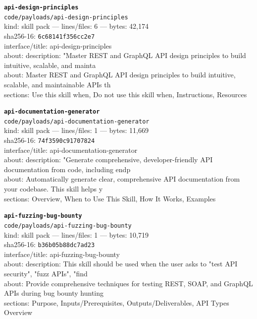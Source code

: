 \noindent\textbf{\texttt{api-design-principles}}\\
\texttt{code/payloads/api-design-principles}\\
kind: skill pack --- lines/files: 6 --- bytes: 42,174\\
sha256-16: \texttt{6c68141f356cc2e7}\\
interface/title: api-design-principles\\
about: description: "Master REST and GraphQL API design principles to build intuitive, scalable, and mainta\\
about: Master REST and GraphQL API design principles to build intuitive, scalable, and maintainable APIs th\\
sections: Use this skill when, Do not use this skill when, Instructions, Resources\\
\vspace*{6.0pt}

\noindent\textbf{\texttt{api-documentation-generator}}\\
\texttt{code/payloads/api-documentation-generator}\\
kind: skill pack --- lines/files: 1 --- bytes: 11,669\\
sha256-16: \texttt{74f3590c91707824}\\
interface/title: api-documentation-generator\\
about: description: "Generate comprehensive, developer-friendly API documentation from code, including endp\\
about: Automatically generate clear, comprehensive API documentation from your codebase. This skill helps y\\
sections: Overview, When to Use This Skill, How It Works, Examples\\
\vspace*{6.0pt}

\noindent\textbf{\texttt{api-fuzzing-bug-bounty}}\\
\texttt{code/payloads/api-fuzzing-bug-bounty}\\
kind: skill pack --- lines/files: 1 --- bytes: 10,719\\
sha256-16: \texttt{b36b05b88dc7ad23}\\
interface/title: api-fuzzing-bug-bounty\\
about: description: This skill should be used when the user asks to "test API security", "fuzz APIs", "find\\
about: Provide comprehensive techniques for testing REST, SOAP, and GraphQL APIs during bug bounty hunting \\
sections: Purpose, Inputs/Prerequisites, Outputs/Deliverables, API Types Overview\\
\vspace*{6.0pt}
\newpage

